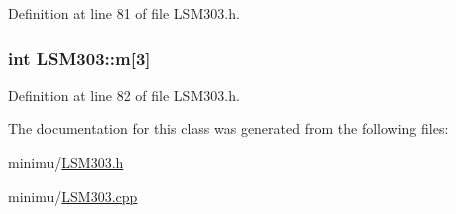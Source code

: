 \-Definition at line 81 of file \-L\-S\-M303.\-h.

\hypertarget{class_l_s_m303_a606cb6a86d385c4c4a9767f6b1bf2ea5}{
\subsubsection[{m}]{\setlength{\rightskip}{0pt plus 5cm}int {\bf \-L\-S\-M303\-::m}\mbox{[}3\mbox{]}}}\label{class_l_s_m303_a606cb6a86d385c4c4a9767f6b1bf2ea5}


\-Definition at line 82 of file \-L\-S\-M303.\-h.



\-The documentation for this class was generated from the following files\-:\begin{DoxyCompactItemize}
\item 
minimu/\hyperlink{_l_s_m303_8h}{\-L\-S\-M303.\-h}\item 
minimu/\hyperlink{_l_s_m303_8cpp}{\-L\-S\-M303.\-cpp}\end{DoxyCompactItemize}
